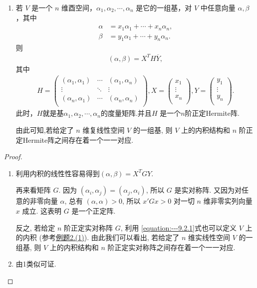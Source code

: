 \documentclass[../../main.tex]{subfiles}
\begin{document}
\begin{theorem}
\begin{enumerate}
\item 若 \(V\) 是一个 \(n\) 维酉空间，\(\alpha_1,\alpha_2,\cdots,\alpha_n\) 是它的一组基，对 \(V\) 中任意向量 \(\alpha,\beta\)，其中
\begin{align*}
\alpha&=x_1\alpha_1+\cdots + x_n\alpha_n,\\
\beta&=y_1\alpha_1+\cdots + y_n\alpha_n.
\end{align*}
则
\begin{align*}
(\alpha,\beta)=X^TH\overline{Y},
\end{align*}
其中
\begin{align*}
H=\left( \begin{matrix}
\left( \alpha _1,\alpha _1 \right)&		\cdots&		\left( \alpha _1,\alpha _n \right)\\
\vdots&		\ddots&		\vdots\\
\left( \alpha _n,\alpha _1 \right)&		\cdots&		\left( \alpha _n,\alpha _n \right)\\
\end{matrix} \right) ,X=\left( \begin{array}{c}
x_1\\
\vdots\\
x_n\\
\end{array} \right) ,Y=\left( \begin{array}{c}
y_1\\
\vdots\\
y_n\\
\end{array} \right) .
\end{align*}
此时，$H$就是基\(\alpha_1,\alpha_2,\cdots,\alpha_n\)的度量矩阵.并且$H$ 是一个$n$阶正定Hermite阵.

由此可知,若给定了 $n$ 维复线性空间 $V$ 的一组基, 则 $V$ 上的内积结构和 $n$ 阶正定Hermite阵之间存在着一个一一对应. 
\end{enumerate} 
\end{theorem}
\begin{proof}
\begin{enumerate}
\item 利用内积的线性性容易得到$(\alpha,\beta)=X^TGY$.
 
再来看矩阵 $G$. 因为 $(\alpha_i, \alpha_j) = (\alpha_j, \alpha_i)$, 所以 $G$ 是实对称阵. 又因为对任意的非零向量 $\alpha$, 总有 $(\alpha, \alpha) > 0$, 所以 $x'Gx > 0$ 对一切 $n$ 维非零实列向量 $x$ 成立. 这表明 $G$ 是一个正定阵. 

反之, 若给定 $n$ 阶正定实对称阵 $G$, 利用 \eqref{equation:---9.2.1}式也可以定义 $V$ 上的内积 (参考\hyperref[example:一些常见的内积及内积空间]{例题2.(1)}). 由此我们可以看出, 若给定了 $n$ 维实线性空间 $V$ 的一组基, 则 $V$ 上的内积结构和 $n$ 阶正定实对称阵之间存在着一个一一对应. 

\item 由1类似可证.
\end{enumerate}
\end{proof}
\end{document}

